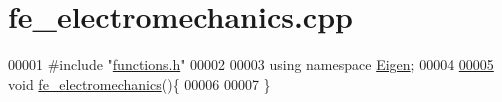 \hypertarget{fe__electromechanics_8cpp_source}{}\section{fe\+\_\+electromechanics.\+cpp}
\label{fe__electromechanics_8cpp_source}

\begin{DoxyCode}
00001 \textcolor{preprocessor}{#include "\hyperlink{functions_8h}{functions.h}"}
00002 
00003 \textcolor{keyword}{using namespace }\hyperlink{namespace_eigen}{Eigen};
00004 
\hyperlink{fe__electromechanics_8cpp_abf35ff8e8153f462c2d0ab9e73de7651}{00005} \textcolor{keywordtype}{void} \hyperlink{fe__electromechanics_8cpp_abf35ff8e8153f462c2d0ab9e73de7651}{fe\_electromechanics}()\{
00006     
00007 \}
\end{DoxyCode}
